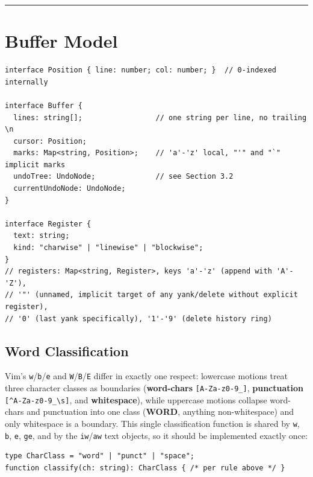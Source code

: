 \documentclass[11pt]{article}
\begin{document}
\begin{center}\rule{0.5\linewidth}{0.5pt}\end{center}

\hypertarget{sec-buffer-model}{%
\section{Buffer Model}\label{sec-buffer-model}}

\begin{Verbatim}[breaklines=true, breakanywhere=true, fontsize=\small]
interface Position { line: number; col: number; }  // 0-indexed internally

interface Buffer {
  lines: string[];                 // one string per line, no trailing \n
  cursor: Position;
  marks: Map<string, Position>;    // 'a'-'z' local, "'" and "`" implicit marks
  undoTree: UndoNode;              // see Section 3.2
  currentUndoNode: UndoNode;
}

interface Register {
  text: string;
  kind: "charwise" | "linewise" | "blockwise";
}
// registers: Map<string, Register>, keys 'a'-'z' (append with 'A'-'Z'),
// '"' (unnamed, implicit target of any yank/delete without explicit register),
// '0' (last yank specifically), '1'-'9' (delete history ring)
\end{Verbatim}

\hypertarget{sec-word-classification}{%
\subsection{Word Classification}\label{sec-word-classification}}

Vim's \texttt{w}/\texttt{b}/\texttt{e} and \texttt{W}/\texttt{B}/\texttt{E} differ in exactly one respect: lowercase
motions treat three character classes as boundaries (\textbf{word-chars}
\texttt{{[}A-Za-z0-9\_{]}}, \textbf{punctuation} \texttt{{[}\^{}A-Za-z0-9\_\textbackslash{}s{]}}, and \textbf{whitespace}), while
uppercase motions collapse word-chars and punctuation into one class
(\textbf{WORD}, anything non-whitespace) and only whitespace is a boundary. This
single classification function is shared by \texttt{w}, \texttt{b}, \texttt{e}, \texttt{ge}, and by the
\texttt{iw}/\texttt{aw} text objects, so it should be implemented exactly once:

\begin{Verbatim}[breaklines=true, breakanywhere=true, fontsize=\small]
type CharClass = "word" | "punct" | "space";
function classify(ch: string): CharClass { /* per rule above */ }
\end{Verbatim}
\end{document}

